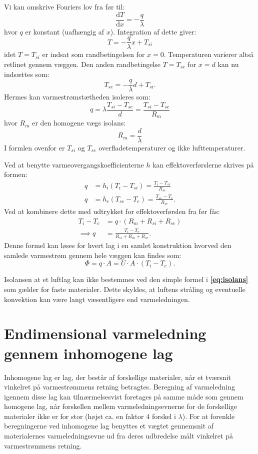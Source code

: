 Vi kan omskrive Fouriers lov fra før til:
\[ 
\frac{\mathrm{d}T}{\mathrm{d}x} = - \frac{q}{\lambda}
\]
hvor $q$ er konstant (uafhængig af $x$). Integration af dette giver:
\[ 
T = - \frac{q}{\lambda}x + T_{si}
\]
idet $T = T_{si}$ er indsat som randbetingelsen for $x=0$. Temperaturen varierer altså retlinet gennem væggen. Den anden randbetingelse $T=T_{se}$ for $x=d$ kan nu indsættes som:
\[ 
T_{se} = - \frac{q}{\lambda} d + T_{si}
.\]
Hermes kan varmestrømstætheden isoleres som:
\[ 
q = \lambda \frac{T_{si} - T_{se}}{d} = \frac{T_{si} - T_{se}}{R_m}
\]
hvor $R_m$ er den homogene vægs isolans:
\begin{equation}\label{eq:isolans}
  R_m = \frac{d}{\lambda}
\end{equation}
I formlen ovenfor er $T_{si}$ og $T_{se}$ overfladetemperaturer og ikke lufttemperaturer. 

Ved at benytte varmeovergangskoefficienterne $h$ kan effektoverførslerne skrives på formen:
\begin{align*}
  q &= h_i \left( T_i - T_{si} \right) = \frac{T_i - T_{si}}{R_{si}} \\
  q &= h_e \left( T_{se} - T_e \right) = \frac{T_{se} - T_e}{R_{se}}
.\end{align*}
Ved at kombinere dette med udtrykket for effektoverførslen fra før fås:
\begin{align*}
  T_i - T_e &= q \cdot \left( R_m + R_{si} + R_{se} \right) \\
  \implies q &= \frac{T_i - T_e}{R_{si} + R_m + R_{se}}
.\end{align*}
Denne formel kan løses for hvert lag i en samlet konstruktion hvorved den samlede varmestrøm gennem hele væggen kan findes som:
\[ 
\Phi = q \cdot A = U \cdot A \cdot \left( T_i - T_e \right)
.\]

Isolansen at et luftlag kan ikke bestemmes ved den simple formel i \textbf{\autoref{eq:isolans}} som gælder for faste materialer. Dette skyldes, at luftens stråling og eventuelle konvektion kan være langt væsentligere end varmeledningen. 

\section{Endimensional varmeledning gennem inhomogene lag}
Inhomogene lag er lag, der består af forskellige materialer, når et tværsnit vinkelret på varmestrømmens retning betragtes. Beregning af varmeledning igennem disse lag kan tilnærmelsesvist foretages på samme måde som gennem homogene lag, når forskellen mellem varmeledningsevnerne for de forskellige materialer ikke er for stor (højst ca. en faktor 4 forskel i $\lambda$). For at forenkle beregningerne ved inhomogene lag benyttes et vægtet gennemsnit af materialernes varmeledningsevne ud fra deres udbredelse målt vinkelret på varmestrømmens retning.

